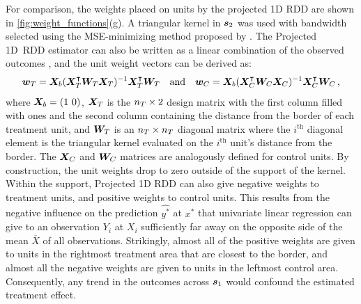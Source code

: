 For comparison, the weights placed on units by the projected 1D RDD are shown in \autoref{fig:weight_functions}(g).
A triangular kernel in \(\bm{s}_2\) was used with bandwidth selected using the MSE-minimizing method proposed by \cite{imbens2012optimal}.
The Projected 1D~RDD estimator can also be written as a linear combination of the observed outcomes , and the unit weight vectors can be derived as:
\begin{equation}
\wt = \Xmat_b (\Xmat_\treat\trans \Wmat_\treat \Xmat_\treat)^{-1} \Xmat_\treat\trans \Wmat_\treat %
\quad\text{and}\quad
\wc = \Xmat_b (\Xmat_\ctrol\trans \Wmat_\ctrol \Xmat_\ctrol)^{-1} \Xmat_\ctrol\trans \Wmat_\ctrol \,,
\label{eq:unit_weights_llr}
\end{equation}
where \(\bm{X}_b = \left\lparen1~0\right\rparen\), \(\bm{X}_T\) is the \(n_T \times 2\) design matrix with the first column filled with ones and the second column containing the distance from the border of each treatment unit, and \(\bm{W}_T\) is an \(n_T \times n_T\) diagonal matrix where the \(i^\mathrm{th}\) diagonal element is the triangular kernel evaluated on the \(i^\mathrm{th}\) unit's distance from the border.
The \(\bm{X}_C\) and \(\bm{W}_C\) matrices are analogously defined for control units.
By construction, the unit weights drop to zero outside of the support of the kernel.
Within the support, Projected 1D RDD can also give negative weights to treatment units, and positive weights to control units.
This results from the negative influence on the prediction \(\widehat{y^*}\) at \(x^*\) that univariate linear regression can give to an observation \(Y_i\) at \(X_i\) sufficiently far away on the opposite side of the mean \(\overline{X}\) of all observations.
Strikingly, almost all of the positive weights are given to units in the rightmost treatment area that are closest to the border, and almost all the negative weights are given to units in the leftmost control area.
Consequently, any trend in the outcomes across \(\bm{s}_1\) would confound the estimated treatment effect.


